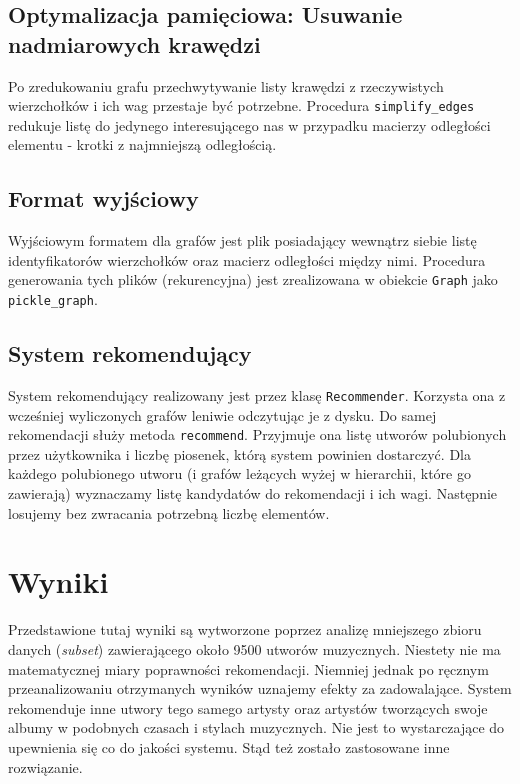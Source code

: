 \documentclass[a4paper,10pt]{article}
\begin{document}
\subsection{Optymalizacja pamięciowa: Usuwanie nadmiarowych krawędzi}

Po zredukowaniu grafu przechwytywanie listy krawędzi z rzeczywistych wierzchołków i ich wag przestaje być potrzebne. Procedura \texttt{simplify\_edges} redukuje listę do jedynego interesującego nas w przypadku macierzy odległości elementu - krotki z najmniejszą odległością.

\subsection{Format wyjściowy}

Wyjściowym formatem dla grafów jest plik posiadający wewnątrz siebie listę identyfikatorów wierzchołków oraz macierz odległości między nimi. Procedura generowania tych plików (rekurencyjna) jest zrealizowana w obiekcie \texttt{Graph} jako \texttt{pickle\_graph}.

\subsection{System rekomendujący}
System rekomendujący realizowany jest przez klasę \texttt{Recommender}. Korzysta ona z wcześniej wyliczonych grafów leniwie odczytując je z dysku.
Do samej rekomendacji służy metoda \texttt{recommend}.
Przyjmuje ona listę utworów polubionych przez użytkownika i liczbę piosenek, którą system powinien dostarczyć.
Dla każdego polubionego utworu (i grafów leżących wyżej w hierarchii, które go zawierają) wyznaczamy listę kandydatów do rekomendacji i ich wagi.
Następnie losujemy bez zwracania potrzebną liczbę elementów.


\section{Wyniki}

Przedstawione tutaj wyniki są wytworzone poprzez analizę mniejszego zbioru danych (\textit{subset}) zawierającego około 9500 utworów muzycznych.
Niestety nie ma matematycznej miary poprawności rekomendacji. Niemniej jednak po ręcznym przeanalizowaniu otrzymanych wyników uznajemy efekty za zadowalające. System rekomenduje inne utwory tego samego artysty oraz artystów tworzących swoje albumy w podobnych czasach i stylach muzycznych. Nie jest to wystarczające do upewnienia się co do jakości systemu. Stąd też zostało zastosowane inne rozwiązanie.
\end{document}
